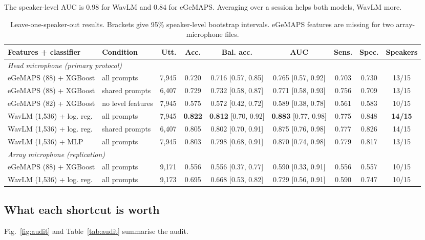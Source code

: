\documentclass[conference]{IEEEtran}
\begin{document}
The speaker-level AUC is 0.98 for WavLM and 0.84 for eGeMAPS. Averaging over a session helps both models, WavLM more.

\begin{table}[t]
\caption{Leave-one-speaker-out results. Brackets give 95\% speaker-level bootstrap intervals. eGeMAPS features are missing for two array-microphone files.}
\label{tab:main}
\centering
\begin{tabular}{llrcccccc}
\toprule
Features + classifier & Condition & Utt. & Acc. & Bal. acc. & AUC & Sens. & Spec. & Speakers\\
\midrule
\multicolumn{9}{l}{\emph{Head microphone (primary protocol)}}\\
eGeMAPS (88) + XGBoost & all prompts & 7,945 & 0.720 & 0.716 [0.57, 0.85] & 0.765 [0.57, 0.92] & 0.703 & 0.730 & 13/15\\
eGeMAPS (88) + XGBoost & shared prompts & 6,407 & 0.729 & 0.732 [0.58, 0.87] & 0.771 [0.58, 0.93] & 0.756 & 0.709 & 13/15\\
eGeMAPS (82) + XGBoost & no level features & 7,945 & 0.575 & 0.572 [0.42, 0.72] & 0.589 [0.38, 0.78] & 0.561 & 0.583 & 10/15\\
WavLM (1,536) + log. reg. & all prompts & 7,945 & \textbf{0.822} & \textbf{0.812} [0.70, 0.92] & \textbf{0.883} [0.77, 0.98] & 0.775 & 0.848 & \textbf{14/15}\\
WavLM (1,536) + log. reg. & shared prompts & 6,407 & 0.805 & 0.802 [0.70, 0.91] & 0.875 [0.76, 0.98] & 0.777 & 0.826 & 14/15\\
WavLM (1,536) + MLP & all prompts & 7,945 & 0.803 & 0.798 [0.68, 0.91] & 0.870 [0.74, 0.98] & 0.779 & 0.817 & 13/15\\
\midrule
\multicolumn{9}{l}{\emph{Array microphone (replication)}}\\
eGeMAPS (88) + XGBoost & all prompts & 9,171 & 0.556 & 0.556 [0.37, 0.77] & 0.590 [0.33, 0.91] & 0.556 & 0.557 & 10/15\\
WavLM (1,536) + log. reg. & all prompts & 9,173 & 0.695 & 0.668 [0.53, 0.82] & 0.729 [0.56, 0.91] & 0.590 & 0.747 & 10/15\\
\bottomrule
\end{tabular}
\end{table}

\subsection{What each shortcut is worth}
Fig.~\ref{fig:audit} and Table~\ref{tab:audit} summarise the audit.
\end{document}
